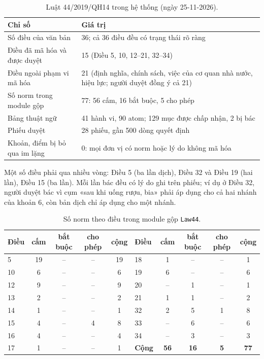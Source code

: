 \documentclass[12pt,a4paper]{article}
\newcommand{\code}[1]{\texttt{#1}}
\begin{document}
\begin{table}[H]
\centering\small
\caption{Luật 44/2019/QH14 trong hệ thống (ngày 25-11-2026).}
\label{tab:coverage}
\begin{tabularx}{\textwidth}{>{\raggedright\arraybackslash}p{5.4cm}L}
\toprule
Chỉ số & Giá trị\\
\midrule
Số điều của văn bản & 36; cả 36 điều đều có trạng thái rõ ràng\\
Điều đã mã hóa và được duyệt & 15 (Điều 5, 10, 12–21, 32–34)\\
Điều ngoài phạm vi mã hóa & 21 (định nghĩa, chính sách, việc của cơ quan nhà nước, hiệu lực; người duyệt đồng ý cả 21)\\
Số norm trong module gộp & 77: 56 cấm, 16 bắt buộc, 5 cho phép\\
Bảng thuật ngữ & 41 hành vi, 90 atom; 129 mục được chấp nhận, 2 bị bác\\
Phiếu duyệt & 28 phiếu, gần 500 dòng quyết định\\
Khoản, điểm bị bỏ qua im lặng & 0: mọi đơn vị có norm hoặc lý do không mã hóa\\
\bottomrule
\end{tabularx}
\end{table}

Một số điều phải qua nhiều vòng: Điều 5 (ba lần dịch), Điều 32 và Điều 19 (hai lần), Điều 15 (ba lần). Mỗi lần bác đều có lý
do ghi trên phiếu; ví dụ ở Điều 32, người duyệt bác vì cụm «sau khi uống rượu, bia» phải áp dụng cho cả hai nhánh của khoản 6,
còn bản dịch chỉ áp dụng cho một nhánh.

\begin{table}[H]
\centering\small
\caption{Số norm theo điều trong module gộp \code{Law44}.}
\label{tab:perarticle}
\begin{tabular}{lcccc|lcccc}
\toprule
Điều & cấm & bắt buộc & cho phép & cộng & Điều & cấm & bắt buộc & cho phép & cộng\\
\midrule
5 & 19 & -- & -- & 19 & 18 & 1 & -- & -- & 1\\
10 & 6 & -- & -- & 6 & 19 & 6 & -- & -- & 6\\
12 & 9 & -- & -- & 9 & 20 & -- & 1 & -- & 1\\
13 & 2 & -- & -- & 2 & 21 & 1 & 1 & -- & 2\\
14 & 1 & -- & -- & 1 & 32 & 2 & 5 & 1 & 8\\
15 & 4 & -- & 4 & 8 & 33 & -- & 6 & -- & 6\\
16 & 4 & -- & -- & 4 & 34 & -- & 3 & -- & 3\\
17 & 1 & -- & -- & 1 & \textbf{Cộng} & \textbf{56} & \textbf{16} & \textbf{5} & \textbf{77}\\
\bottomrule
\end{tabular}
\end{table}
\end{document}
